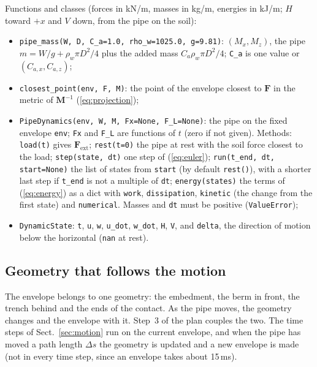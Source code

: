 \documentclass[11pt,a4paper]{article}
\begin{document}
Functions and classes (forces in kN/m, masses in kg/m, energies in
kJ/m; $H$ toward $+x$ and $V$ down, from the pipe on the soil):
\begin{itemize}
  \item \texttt{pipe\_mass(W, D, C\_a=1.0, rho\_w=1025.0, g=9.81)}:
    $(M_x, M_z)$, the pipe $m = W/g + \rho_w\pi D^2/4$ plus the added
    mass $C_a\rho_w\pi D^2/4$; \texttt{C\_a} is one value or
    $(C_{a,x}, C_{a,z})$;
  \item \texttt{closest\_point(env, F, M)}: the point of the envelope
    closest to $\mathbf{F}$ in the metric of $\mathbf{M}^{-1}$
    (\ref{eq:projection});
  \item \texttt{PipeDynamics(env, W, M, Fx=None, F\_L=None)}: the pipe
    on the fixed envelope \texttt{env}; \texttt{Fx} and \texttt{F\_L}
    are functions of $t$ (zero if not given).  Methods:
    \texttt{load(t)} gives $\mathbf{F}_\text{ext}$; \texttt{rest(t=0)}
    the pipe at rest with the soil force closest to the load;
    \texttt{step(state, dt)} one step of (\ref{eq:euler});
    \texttt{run(t\_end, dt, start=None)} the list of states from
    \texttt{start} (by default \texttt{rest()}), with a shorter last step
    if \texttt{t\_end} is not a multiple of \texttt{dt};
    \texttt{energy(states)} the terms of (\ref{eq:energy}) as a dict with
    \texttt{work}, \texttt{dissipation}, \texttt{kinetic} (the change from
    the first state) and \texttt{numerical}.  Masses and \texttt{dt} must
    be positive (\texttt{ValueError});
  \item \texttt{DynamicState}: \texttt{t}, \texttt{u}, \texttt{w},
    \texttt{u\_dot}, \texttt{w\_dot}, \texttt{H}, \texttt{V}, and
    \texttt{delta}, the direction of motion below the horizontal
    (\texttt{nan} at rest).
\end{itemize}

\subsection{Geometry that follows the motion}
\label{sec:geometry_time}

The envelope belongs to one geometry: the embedment, the berm in front,
the trench behind and the ends of the contact.  As the pipe moves, the
geometry changes and the envelope with it.  Step~3 of the plan couples
the two.  The time steps of Sect.~\ref{sec:motion} run on the current
envelope, and when the pipe has moved a path length $\Delta s$ the
geometry is updated and a new envelope is made (not in every time
step, since an envelope takes about 15\,ms).
\end{document}
